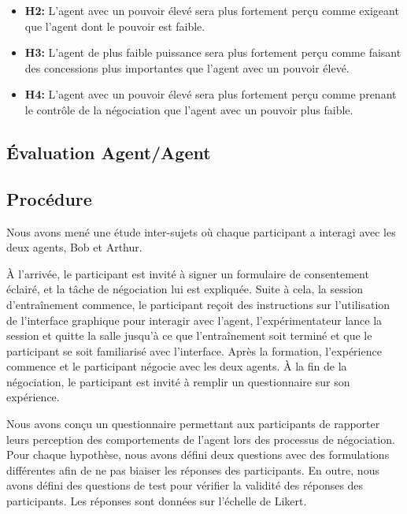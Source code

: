 \documentclass [french]{sig-alternate-05-2015}
\begin{document}
{\begin{itemize}
				\item \textbf {H2:} L'agent avec un pouvoir élevé sera plus fortement perçu comme exigeant que l'agent dont le pouvoir est faible.
				
				\item \textbf {H3:} L'agent de plus faible puissance sera plus fortement perçu comme faisant des concessions plus importantes que l'agent  avec un pouvoir élevé.
				
				\item \textbf {H4:} L'agent  avec un pouvoir élevé sera plus fortement perçu comme prenant le contrôle de la négociation que l'agent avec un pouvoir plus faible.
			
			\end{itemize}


			\subsection{Évaluation Agent/Agent}
				
			
			\subsection{Procédure}
			
			Nous avons mené une étude inter-sujets où chaque participant a interagi avec les deux agents, Bob et Arthur.
			
			À l'arrivée, le participant est invité à signer un formulaire de consentement éclairé, et  la tâche de négociation lui est expliquée. 
			Suite à cela, la  session d'entraînement commence, le participant reçoit des instructions sur l'utilisation de l'interface graphique pour interagir avec l'agent, l'expérimentateur lance la session et quitte la salle jusqu'à ce que l'entraînement soit terminé et que le participant se soit familiarisé avec l'interface.
			 Après la formation, l'expérience commence et le participant négocie avec les deux agents. À la fin de la négociation, le participant est invité à remplir un questionnaire sur son expérience.
			
			Nous avons conçu un questionnaire permettant aux participants de rapporter leurs perception des comportements de l'agent lors des processus de négociation. Pour chaque hypothèse, nous avons défini deux questions avec des formulations différentes afin de ne pas biaiser les réponses des participants. En outre, nous avons défini des questions de test pour vérifier la validité des réponses des participants. Les réponses sont données sur l'échelle de Likert.
			
}
\end{document}
